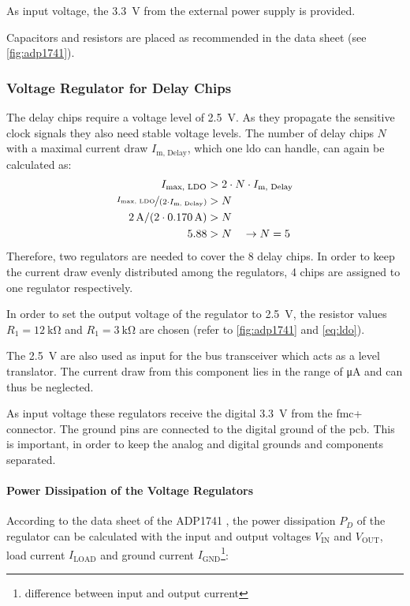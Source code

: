 As input voltage, the \SI{3.3}{\volt} from the external power supply is provided. 

Capacitors and resistors are placed as recommended in the data sheet \cite{adp1741}(see \autoref{fig:adp1741}).

\subsubsection*{Voltage Regulator for Delay Chips}
The delay chips require a voltage level of \SI{2.5}{\volt}. As they propagate the sensitive clock signals they also need stable voltage levels. 
The number of delay chips $N$ with a maximal current draw $I_\text{m, Delay}$, which one \gls{ldo} can handle, can again be calculated as:
\begin{align*}
	I_\text{max, LDO}                                         & > 2 \cdot N \cdot I_\text{m, Delay} \\
	\nicefrac{I_\text{max, LDO}}{(2 \cdot I_\text{m, Delay})} & > N                                 \\
	\SI{2}{\ampere} / (2 \cdot \SI{0.170}{\ampere})            & > N                                 \\
	5.88                                                      & > N \quad \rightarrow N = 5
\end{align*}
Therefore, two regulators are needed to cover the 8 delay chips.
In order to keep the current draw evenly distributed among the regulators, 4 chips are assigned to one regulator respectively.

In order to set the output voltage of the regulator to \SI{2.5}{\volt}, the resistor values $R_1 = \SI{12}{\kilo \ohm}$ and $R_1 = \SI{3}{\kilo \ohm}$ are chosen (refer to \autoref{fig:adp1741} and \autoref{eq:ldo}). %

The \SI{2.5}{\volt} are also used as input for the bus transceiver which acts as a level translator. 
The current draw from this component lies in the range of \si{\micro \ampere} and can thus be neglected.

As input voltage these regulators receive the digital \SI{3.3}{\volt} from the \gls{fmc}+ connector.
The ground pins are connected to the digital ground of the \gls{pcb}.
This is important, in order to keep the analog and digital grounds and components separated.

\paragraph{Power Dissipation of the Voltage Regulators}
According to the data sheet of the ADP1741 \cite{adp1741}, the power dissipation $P_D$ of the regulator can be calculated with the input and output voltages $V_\text{IN}$ and $V_\text{OUT}$, load current $I_\text{LOAD}$ and ground current $I_\text{GND}$\footnote{difference between input and output current}:

